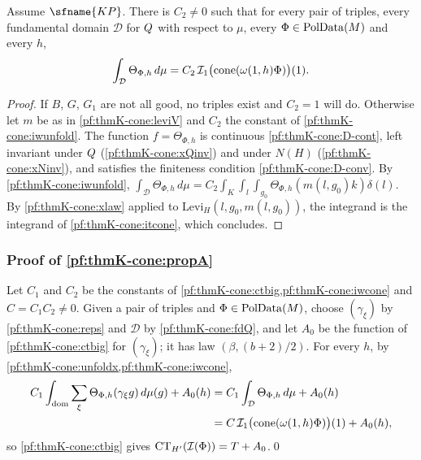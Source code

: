 \begin{lemma}\label{pf:thmK-cone:iwcone}
Assume $\sfname{KP}$.  There is $C_2\neq0$ such that for every pair of triples, every fundamental domain $\mathcal D$ for
$Q$ with respect to $\mu$, every $\Phi\in\operatorname{PolData}(M)$ and every $h$,
\[
  \int_{\mathcal D}\Theta_{\Phi,h}\,d\mu=C_2\,\mathcal{I}_1\bigl(\operatorname{cone}(\omega(1,h)\Phi)\bigr)(1).
\]
\end{lemma}

\begin{proof}
If $B$, $G$, $G_1$ are not all good, no triples exist and $C_2=1$ will do.  Otherwise let $m$ be as in
\cref{pf:thmK-cone:leviV} and $C_2$ the constant of \cref{pf:thmK-cone:iwunfold}.  The function $f=\Theta_{\Phi,h}$ is
continuous \ref{pf:thmK-cone:D-cont}, left invariant under $Q$ (\cref{pf:thmK-cone:xQinv}) and under $N(H)$
(\cref{pf:thmK-cone:xNinv}), and satisfies the finiteness condition \ref{pf:thmK-cone:D-conv}.  By
\cref{pf:thmK-cone:iwunfold}, $\int_{\mathcal D}\Theta_{\Phi,h}\,d\mu=C_2\int_K\int_l\int_{g_0}
\Theta_{\Phi,h}(m(l,g_0)k)\delta(l)$.  By \cref{pf:thmK-cone:xlaw} applied to $\mathrm{Levi}_H(l,g_0,m(l,g_0))$, the integrand
is the integrand of \cref{pf:thmK-cone:itcone}, which concludes.
\end{proof}

\subsubsection{Proof of \texorpdfstring{\cref{pf:thmK-cone:propA}}{the first proposition}}
Let $C_1$ and $C_2$ be the constants of \cref{pf:thmK-cone:ctbig,pf:thmK-cone:iwcone} and $C=C_1C_2\neq0$.  Given a pair of
triples and $\Phi\in\operatorname{PolData}(M)$, choose $(\gamma_\xi)$ by \cref{pf:thmK-cone:reps} and $\mathcal D$ by
\cref{pf:thmK-cone:fdQ}, and let $A_0$ be the function of \cref{pf:thmK-cone:ctbig} for $(\gamma_\xi)$; it has law
$(\beta,(b+2)/2)$.  For every $h$, by \cref{pf:thmK-cone:unfoldx,pf:thmK-cone:iwcone},
\begin{align*}
  C_1\int_{\mathrm{dom}}\sum_\xi\Theta_{\Phi,h}(\gamma_\xi g)\,d\mu(g)+A_0(h)
  &=C_1\int_{\mathcal D}\Theta_{\Phi,h}\,d\mu+A_0(h)\\
  &=C\,\mathcal{I}_1\bigl(\operatorname{cone}(\omega(1,h)\Phi)\bigr)(1)+A_0(h),
\end{align*}
so \cref{pf:thmK-cone:ctbig} gives $\mathrm{CT}_{H'}(\mathcal{I}(\Phi))=T+A_0$.\qed

